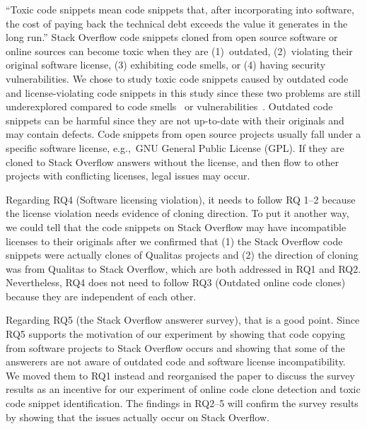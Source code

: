 \documentclass[a4paper,twoside,10pt]{reviewresponse}
\begin{document}
``Toxic code snippets mean code snippets that, after incorporating into
software, the cost of paying back the technical debt exceeds the value it
generates in the long run.'' Stack Overflow code snippets cloned from open
source software or online sources can become toxic when they are (1)~outdated,
(2)~violating their original software license, (3) exhibiting code smells, or
(4) having security vulnerabilities. We chose to study toxic code snippets
caused by outdated code and license-violating code snippets in this study since
these two problems are still underexplored compared to code
smells~\citep{Tufano2015} or vulnerabilities~\citep{Acar2016,Fischer2017}.
Outdated code snippets can be harmful since they are not up-to-date with their
originals and may contain defects. Code snippets from open source projects
usually fall under a specific software license, e.g.,\ GNU General Public License
(GPL). If they are cloned to Stack Overflow answers without the license, and
then flow to other projects with conflicting licenses, legal issues may occur.


Regarding RQ4 (Software licensing violation), it needs to follow RQ 1--2 because
the license violation needs evidence of cloning direction. To put it another
way, we could tell that the code snippets on Stack Overflow may have
incompatible licenses to their originals after we confirmed that (1) the Stack
Overflow code snippets were actually clones of Qualitas projects and (2) the
direction of cloning was from Qualitas to Stack Overflow, which are both
addressed in RQ1 and RQ2. Nevertheless, RQ4 does not need to follow RQ3
(Outdated online code clones) because they are independent of each other.

Regarding RQ5 (the Stack Overflow answerer survey), that is a good point. Since
RQ5 supports the motivation of our experiment by showing that code
copying from software projects to Stack Overflow occurs and showing
that some of the answerers are not aware of outdated code and software license
incompatibility. We moved them to RQ1 instead and reorganised the paper to
discuss the survey results as an incentive for our experiment of online code
clone detection and toxic code snippet identification. The findings in RQ2--5
will confirm the survey results by showing that the issues actually occur on
Stack Overflow.
\end{document}
